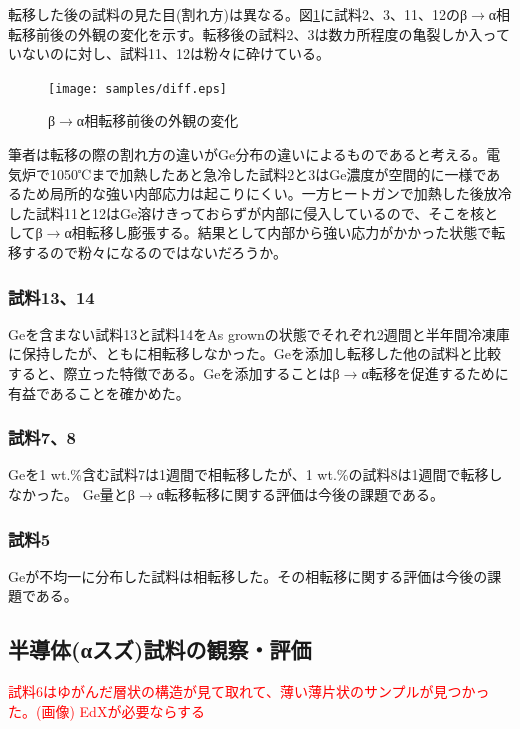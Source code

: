 転移した後の試料の見た目(割れ方)は異なる。図\ref{fig:diff}に試料2、3、11、12のβ$\to$α相転移前後の外観の変化を示す。転移後の試料2、3は数カ所程度の亀裂しか入っていないのに対し、試料11、12は粉々に砕けている。
\begin{figure}[!h]
    \begin{center}
   \texttt{[image: samples/diff.eps]}
  \end{center}
  \caption{β$\to$α相転移前後の外観の変化}
  \label{fig:diff}
\end{figure}

筆者は転移の際の割れ方の違いがGe分布の違いによるものであると考える。電気炉で1050℃まで加熱したあと急冷した試料2と3はGe濃度が空間的に一様であるため局所的な強い内部応力は起こりにくい。一方ヒートガンで加熱した後放冷した試料11と12はGe溶けきっておらずが内部に侵入しているので、そこを核としてβ$\to$α相転移し膨張する。結果として内部から強い応力がかかった状態で転移するので粉々になるのではないだろうか。

\subsubsection{試料13、14}
Geを含まない試料13と試料14をAs grownの状態でそれぞれ2週間と半年間冷凍庫に保持したが、ともに相転移しなかった。Geを添加し転移した他の試料と比較すると、際立った特徴である。Geを添加することはβ$\to$α転移を促進するために有益であることを確かめた。

\subsubsection{試料7、8}
Geを1 wt.\%含む試料7は1週間で相転移したが、1 wt.\%の試料8は1週間で転移しなかった。
Ge量とβ$\to$α転移転移に関する評価は今後の課題である。

\subsubsection{試料5}
Geが不均一に分布した試料は相転移した。その相転移に関する評価は今後の課題である。

\subsection{半導体(αスズ)試料の観察・評価}

\textcolor{red}{試料6はゆがんだ層状の構造が見て取れて、薄い薄片状のサンプルが見つかった。(画像)}
\textcolor{red}{EdXが必要ならする}

